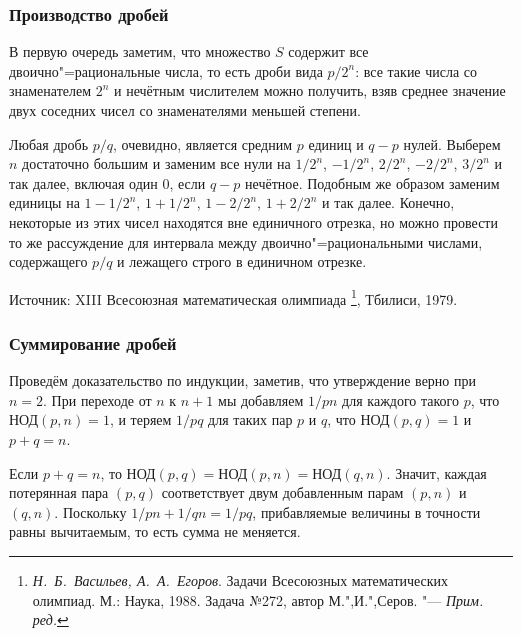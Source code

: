 \documentclass[twoside]{book}
\newcommand\VsMO{\emph{Н.~Б.~Васильев, А.~А.~Егоров}. Задачи Всесоюзных математических олимпиад. М.: Наука, 1988}
\begin{document}



\subsubsection*{Производство дробей}%

В первую очередь заметим, что множество $S$ содержит все двоично"=рациональные числа, 
то есть дроби вида $p/2^n$: все такие числа со знаменателем $2^n$ и нечётным числителем можно получить, взяв среднее значение двух соседних чисел со знаменателями меньшей степени.

Любая дробь $p/q$, очевидно, является средним $p$ единиц и $q-p$ нулей.
Выберем $n$ достаточно большим и заменим все нули на $1/2^n$, $-1/2^n$, $2/2^n$, $-2/2^n$, $3/2^n$ и так далее, включая один $0$, если $q-p$ нечётное.
Подобным же образом заменим единицы на $1-1/2^n$, $1+1/2^n$, $1-2/2^n$, $1+2/2^n$ и так далее.
Конечно, некоторые из этих чисел находятся вне единичного отрезка, но можно провести то же рассуждение для интервала между двоично"=рациональными числами, содержащего $p/q$ и лежащего строго в единичном отрезке.%
\heart


\medskip
{%
Источник: XIII Всесоюзная математическая олимпиада%
\footnote{%
\VsMO. Задача №272, автор  М.",И.",Серов. "--- \emph{Прим. ред.}}, Тбилиси, 1979.

}

\subsubsection*{Суммирование дробей}%

Проведём доказательство по индукции, заметив, что утверждение верно при $n=2$.
При переходе от $n$ к $n+1$ мы добавляем $1/pn$ для каждого такого $p$, что $\text{НОД}(p,n)=1$, и теряем $1/pq$ для таких пар $p$ и $q$, что $\text{НОД}(p,q)=1$ и $p+q=n$.

Если $p+q=n$, то
$\text{НОД}(p,q)=\text{НОД}(p,n)=\text{НОД}(q,n)$.
Значит, каждая потерянная пара $(p,q)$ соответствует двум добавленным парам $(p,n)$ и $(q,n)$.
Поскольку $1/pn+1/qn=1/pq$, прибавляемые величины в точности равны вычитаемым, то есть сумма не меняется.
\heart
\end{document}
